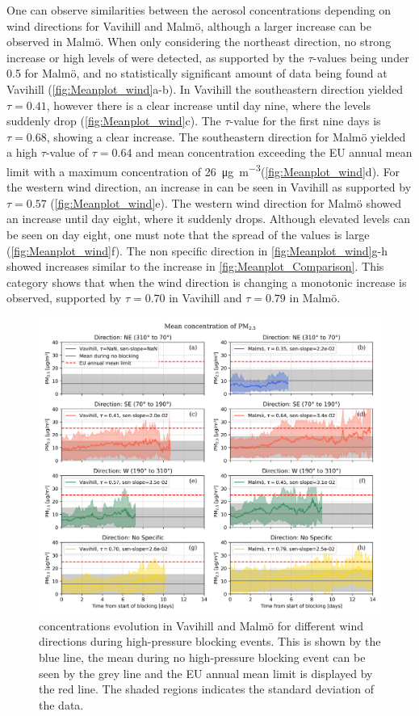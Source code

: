 One can observe similarities between the aerosol concentrations depending on wind directions for Vavihill and Malmö, although a larger increase can be observed in Malmö. When only considering the northeast direction, no strong increase or high levels of \PM were detected, as supported by the $\tau$-values being under 0.5 for Malmö, and no statistically significant amount of data being found at Vavihill (\autoref{fig:Meanplot_wind}a-b). In Vavihill the southeastern direction yielded $\tau=0.41$, however there is a clear increase until day nine, where the levels suddenly drop (\autoref{fig:Meanplot_wind}c). The $\tau$-value for the first nine days is $\tau=0.68$, showing a clear increase. The southeastern direction for Malmö yielded a high $\tau$-value of $\tau=0.64$ and mean concentration exceeding the EU annual mean limit with a maximum concentration of \SI{26}{\micro\gram\per\meter\cubed}(\autoref{fig:Meanplot_wind}d). For the western wind direction, an increase in \PM can be seen in Vavihill as supported by $\tau=0.57$ (\autoref{fig:Meanplot_wind}e). The western wind direction for Malmö showed an increase until day eight, where it suddenly drops. Although elevated levels can be seen on day eight, one must note that the spread of the values is large (\autoref{fig:Meanplot_wind}f). The non specific direction in \autoref{fig:Meanplot_wind}g-h showed increases similar to the increase in \autoref{fig:Meanplot_Comparison}. This category shows that when the wind direction is changing a monotonic increase is observed, supported by $\tau=0.70$ in Vavihill and $\tau=0.79$ in Malmö. 

\begin{figure}[H]
    \centering
    \includegraphics[width=\textwidth]{Figures/Meanplot_dir.png}
    \caption{\PM concentrations evolution in Vavihill and Malmö for different wind directions during high-pressure blocking events. This is shown by the blue line, the mean during no high-pressure blocking event can be seen by the grey line and the EU annual mean limit is displayed by the red line. The shaded regions indicates the standard deviation of the data.}
    \label{fig:Meanplot_wind}
\end{figure}


